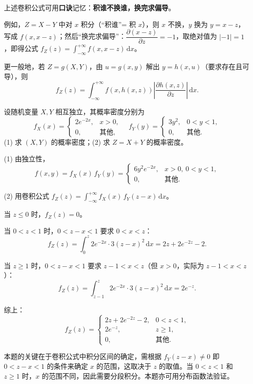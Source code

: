 \documentclass[lang=cn,11pt]{elegantbook}
\begin{document}
\begin{note}
上述卷积公式可用\textbf{口诀}记忆：\textbf{积谁不换谁，换完求偏导}。

例如，$Z = X - Y$ 中对 $x$ 积分（``积谁''= 积 $x$），则 $x$ 不换，$y$ 换为 $y = x - z$，写成 $f(x, x-z)$；然后``换完求偏导''：$\dfrac{\partial(x-z)}{\partial z} = -1$，取绝对值为 $|-1| = 1$，即得公式 $f_Z(z) = \displaystyle\int_{-\infty}^{+\infty}f(x, x-z)\,\mathrm{d}x$。

更一般地，若 $Z = g(X,Y)$，由 $u = g(x,y)$ 解出 $y = h(x,u)$（要求存在且可导），则
\[
f_Z(z) = \int_{-\infty}^{+\infty}f(x, h(x,z))\left|\frac{\partial h(x,z)}{\partial z}\right|\,\mathrm{d}x.
\]
\end{note}

\begin{exercise}[卷积公式分段积分] \label{exer:3-8b}
设随机变量 $X, Y$ 相互独立，其概率密度分别为
\[
f_X(x) = \begin{cases} 2e^{-2x}, & x > 0, \\ 0, & \text{其他}, \end{cases} \quad f_Y(y) = \begin{cases} 3y^2, & 0 < y < 1, \\ 0, & \text{其他}. \end{cases}
\]
(1) 求 $(X,Y)$ 的概率密度；(2) 求 $Z = X + Y$ 的概率密度。
\end{exercise}

\begin{solution}
(1) 由独立性，
\[
f(x,y) = f_X(x)\,f_Y(y) = \begin{cases} 6y^2 e^{-2x}, & x > 0,\ 0 < y < 1, \\ 0, & \text{其他}. \end{cases}
\]

(2) 用卷积公式 $f_Z(z) = \displaystyle\int_{-\infty}^{+\infty}f_X(x)\,f_Y(z-x)\,\mathrm{d}x$。

当 $z \leqslant 0$ 时，$f_Z(z) = 0$。

当 $0 < z < 1$ 时，$0 < z - x < 1$ 要求 $0 < x < z$：
\[
f_Z(z) = \int_0^z 2e^{-2x} \cdot 3(z-x)^2\,\mathrm{d}x = 2z + 2e^{-2z} - 2.
\]

当 $z \geqslant 1$ 时，$0 < z - x < 1$ 要求 $z-1 < x < z$（但 $x > 0$，实际为 $z-1 < x < z$）：
\[
f_Z(z) = \int_{z-1}^z 2e^{-2x} \cdot 3(z-x)^2\,\mathrm{d}x = 2e^{-z}.
\]

综上：
\[
f_Z(z) = \begin{cases} 2z + 2e^{-2z} - 2, & 0 < z < 1, \\ 2e^{-z}, & z \geqslant 1, \\ 0, & \text{其他}. \end{cases}
\]

\begin{note}
本题的关键在于卷积公式中积分区间的确定，需根据 $f_Y(z-x) \neq 0$ 即 $0 < z-x < 1$ 的条件来确定 $x$ 的范围，这取决于 $z$ 的取值。当 $0 < z < 1$ 和 $z \geqslant 1$ 时，$x$ 的范围不同，因此需要分段积分。本题亦可用分布函数法验证。
\end{note}
\end{solution}
\end{document}
